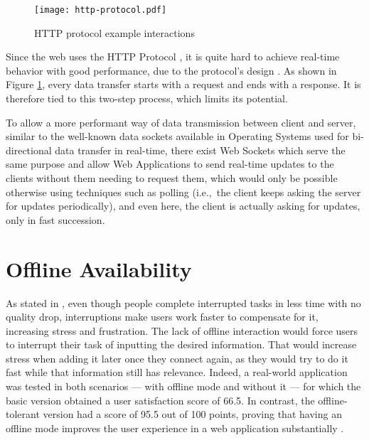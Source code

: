\begin{figure}[t]
    \begin{center}
      \leavevmode
      \texttt{[image: http-protocol.pdf]}
      \caption{HTTP protocol example interactions}
      \label{fig:http-protocol}
    \end{center}
  \end{figure}

  Since the web uses the HTTP Protocol \cite{http1-1protocol} \cite{http2protocol}, it is quite hard to achieve real-time behavior with good performance, due to the protocol's design \cite{Spero1994}. As shown in Figure \ref{fig:http-protocol}, every data transfer starts with a request and ends with a response. It is therefore tied to this two-step process, which limits its potential. 
  
  To allow a more performant way of data transmission between client and server, similar to the well-known data sockets available in Operating Systems used for bi-directional data transfer in real-time, there exist Web Sockets \cite{websocket-protocol} which serve the same purpose and allow Web Applications to send real-time updates to the clients without them needing to request them, which would only be possible otherwise using techniques such as polling (i.e.,\ the client keeps asking the server for updates periodically), and even here, the client is actually asking for updates, only in fast succession.

\section{Offline Availability}\label{sec:offline-avail-sota}

As stated in \cite{Mark2008}, even though people complete interrupted tasks in less time with no quality drop, interruptions make users work faster to compensate for it, increasing stress and frustration. The lack of offline interaction would force users to interrupt their task of inputting the desired information. That would increase stress when adding it later once they connect again, as they would try to do it fast while that information still has relevance. Indeed, a real-world application was tested in both scenarios --- with offline mode and without it --- for which the basic version obtained a user satisfaction score of 66.5. In contrast, the offline-tolerant version had a score of 95.5 out of 100 points, proving that having an offline mode improves the user experience in a web application substantially \cite{Marco2015}. 

